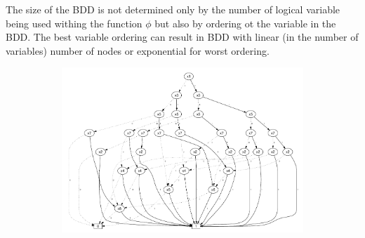 \documentclass[pdflatex,sn-mathphys-num]{sn-jnl}%
\theoremstyle{thmstyleone}%
\theoremstyle{thmstyletwo}%
\theoremstyle{thmstylethree}%
\begin{document}
        The size of the BDD is not determined only by the number of logical variable being used withing the function $\phi$ but also by ordering ot the variable in the BDD. The best variable ordering can result in BDD with linear (in the number of variables) number of nodes or exponential for worst ordering.

        \begin{figure}[H]
            \centering
            \begin{subfigure}{0.5\textwidth}
                \includegraphics[width=1.2\textwidth]{Figures/BDD_Variable_Ordering_Bad.pdf}
            \end{subfigure}
            \hspace*{2cm}
            \begin{subfigure}{0.3\textwidth}
                \hspace*{1cm}

\end{subfigure}
\end{figure}
\end{document}
